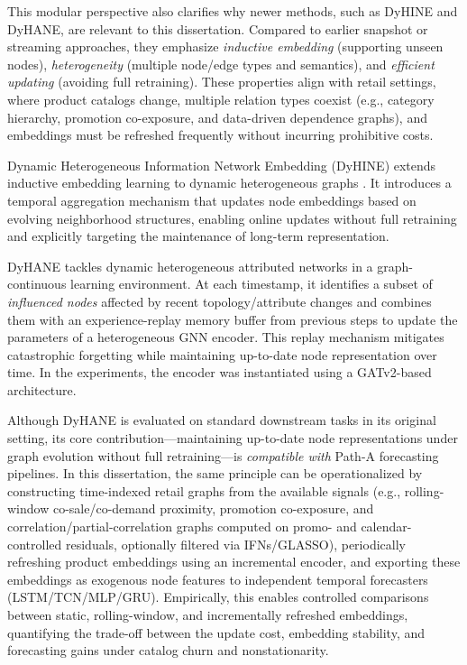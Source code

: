 This modular perspective also clarifies why newer methods, such as DyHINE and DyHANE, are relevant to this dissertation. Compared to earlier snapshot or streaming approaches, they emphasize \emph{inductive embedding} (supporting unseen nodes), \emph{heterogeneity} (multiple node/edge types and semantics), and \emph{efficient updating} (avoiding full retraining). These properties align with retail settings, where product catalogs change, multiple relation types coexist (e.g., category hierarchy, promotion co-exposure, and data-driven dependence graphs), and embeddings must be refreshed frequently without incurring prohibitive costs.

Dynamic Heterogeneous Information Network Embedding (DyHINE) extends inductive embedding learning to dynamic heterogeneous graphs \cite{xie2021dyhine}. It introduces a temporal aggregation mechanism that updates node embeddings based on evolving neighborhood structures, enabling online updates without full retraining and explicitly targeting the maintenance of long-term representation.

DyHANE \cite{martirano2024dyhane} tackles dynamic heterogeneous attributed networks in a graph-continuous learning environment. At each timestamp, it identifies a subset of \emph{influenced nodes} affected by recent topology/attribute changes and combines them with an experience-replay memory buffer from previous steps to update the parameters of a heterogeneous GNN encoder. This replay mechanism mitigates catastrophic forgetting while maintaining up-to-date node representation over time. In the experiments, the encoder was instantiated using a GATv2-based architecture.

Although DyHANE is evaluated on standard downstream tasks in its original setting, its core contribution—maintaining up-to-date node representations under graph evolution without full retraining—is \emph{compatible with} Path-A forecasting pipelines. In this dissertation, the same principle can be operationalized by constructing time-indexed retail graphs from the available signals (e.g., rolling-window co-sale/co-demand proximity, promotion co-exposure, and correlation/partial-correlation graphs computed on promo- and calendar-controlled residuals, optionally filtered via IFNs/GLASSO), periodically refreshing product embeddings using an incremental encoder, and exporting these embeddings as exogenous node features to independent temporal forecasters (LSTM/TCN/MLP/GRU). Empirically, this enables controlled comparisons between static, rolling-window, and incrementally refreshed embeddings, quantifying the trade-off between the update cost, embedding stability, and forecasting gains under catalog churn and nonstationarity.

